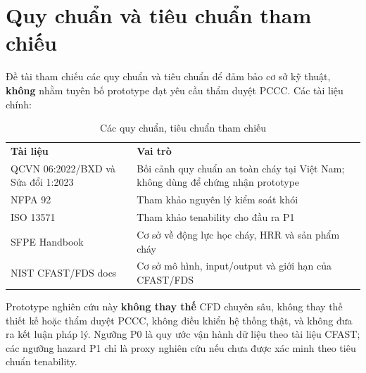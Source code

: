 \section{Quy chuẩn và tiêu chuẩn tham chiếu}
\label{sec:quychuan}

Đề tài tham chiếu các quy chuẩn và tiêu chuẩn để đảm bảo cơ sở kỹ thuật, \textbf{không} nhằm tuyên bố prototype đạt yêu cầu thẩm duyệt PCCC. Các tài liệu chính:

\begin{table}[H]
\centering
\caption{Các quy chuẩn, tiêu chuẩn tham chiếu}
\label{tab:standards}
\begin{tabularx}{\textwidth}{l X}
\toprule
\textbf{Tài liệu} & \textbf{Vai trò} \\
QCVN 06:2022/BXD và Sửa đổi 1:2023 & Bối cảnh quy chuẩn an toàn cháy tại Việt Nam; không dùng để chứng nhận prototype \cite{qcvn06_2022} \\
NFPA 92                & Tham khảo nguyên lý kiểm soát khói \cite{nfpa92} \\
ISO 13571              & Tham khảo tenability cho đầu ra P1 \cite{iso13571} \\
SFPE Handbook          & Cơ sở về động lực học cháy, HRR và sản phẩm cháy \cite{sfpe_handbook} \\
NIST CFAST/FDS docs    & Cơ sở mô hình, input/output và giới hạn của CFAST/FDS \cite{cfast_guide,cfast_tech,fds_guide,fds_tech} \\
\bottomrule
\end{tabularx}
\end{table}

\begin{warningbox}
Prototype nghiên cứu này \textbf{không thay thế} CFD chuyên sâu, không thay thế thiết kế hoặc thẩm duyệt PCCC, không điều khiển hệ thống thật, và không đưa ra kết luận pháp lý. Ngưỡng P0 là quy ước vận hành dữ liệu theo tài liệu CFAST; các ngưỡng hazard P1 chỉ là proxy nghiên cứu nếu chưa được xác minh theo tiêu chuẩn tenability.
\end{warningbox}
